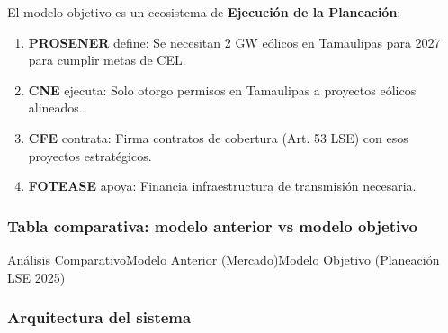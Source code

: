 \documentclass{cel}
\begin{document}
El modelo objetivo es un ecosistema de \textbf{Ejecución de la Planeación}:


\begin{enumerate}
\item \textbf{PROSENER} define: \textquotedbl{}Se necesitan 2 GW eólicos en Tamaulipas para 2027 para cumplir metas de CEL\textquotedbl{}.
\item \textbf{CNE} ejecuta: \textquotedbl{}Solo otorgo permisos en Tamaulipas a proyectos eólicos alineados\textquotedbl{}.
\item \textbf{CFE} contrata: \textquotedbl{}Firma contratos de cobertura (Art. 53 LSE) con esos proyectos estratégicos\textquotedbl{}.
\item \textbf{FOTEASE} apoya: \textquotedbl{}Financia infraestructura de transmisión necesaria\textquotedbl{}.

\end{enumerate}
\vspace{0.4cm}
\subsubsection{Tabla comparativa: modelo anterior vs modelo objetivo}
\nopagebreak

\vspace{0.3cm}
\begin{tablaParadigmaV2}{Análisis Comparativo}{Modelo Anterior (Mercado)}{Modelo Objetivo (Planeación LSE 2025)}
\end{tablaParadigmaV2}

\subsubsection{Arquitectura del sistema}
\nopagebreak
\end{document}

